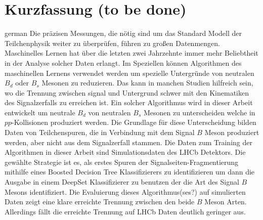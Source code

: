 \section*{Kurzfassung (to be done)} %
\begin{foreignlanguage}{german}
    Die präzisen Messungen, die nötig sind um das Standard Modell der Teilchenphysik weiter zu überprüfen, führen zu großen Datenmengen.
    Maschinelles Lernen hat über die letzten zwei Jahrzehnte immer mehr Beliebtheit in der Analyse solcher Daten erlangt.
    Im Speziellen können Algorithmen des maschinellen Lernens verwendet werden um spezielle Untergründe von neutralen $B_d$ oder $B_s$ Mesonen zu reduzieren.
    Das kann in manchen Studien hilfreich sein, wo die Trennung zwischen signal und Untergrund schwer mit den Kinematiken des Signalzerfalls zu erreichen ist.
    Ein solcher Algorithmus wird in dieser Arbeit entwickelt um neutrale $B_d$ von neutralen $B_s$ Mesonen zu unterscheiden welche in $pp$-Kollisionen produziert werden.
    Die Grundlage für diese Unterscheidung bilden Daten von Teilchenspuren, die in Verbindung mit dem Signal $B$ Meson produziert werden, aber nicht aus dem Signalzerfall stammen.
    Die Daten zum Training der Algorithmen in dieser Arbeit sind Simulationsdaten des LHCb Detektors.
    Die gewählte Strategie ist es, als erstes Spuren der Signalseiten-Fragmentierung mithilfe eines Boosted Decision Tree Klassifizierers zu identifizieren 
    um dann die Ausgabe in einem DeepSet Klassifizierer zu benutzen der die Art des Signal $B$ Mesons identifiziert.
    Die Evaluierung dieses Algorithmus(ses?) auf simulierten Daten zeigt eine klare erreichte Trennung zwischen den beide $B$ Meson Arten. %
    Allerdings fällt die erreichte Trennung auf LHCb Daten deutlich geringer aus.
\end{foreignlanguage}
